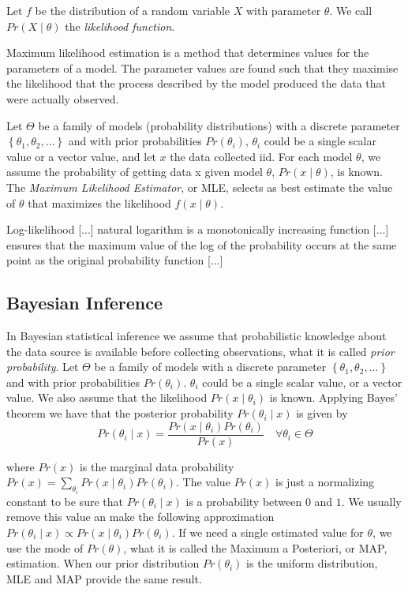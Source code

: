 \begin{definition}
Let $f$ be the distribution of a random variable $X$ with parameter $\theta$. We call $Pr(X \mid \theta)$ the \emph{likelihood function}.
\end{definition}

{\color{red} Maximum likelihood estimation is a method that determines values for the parameters of a model. The parameter values are found such that they maximise the likelihood that the process described by the model produced the data that were actually observed.}

Let $\Theta$ be a family of models (probability distributions) with a discrete parameter $\left\{ \theta_1,\theta_2,\ldots \right\}$ and with prior probabilities $Pr\left(\theta_i \right)$, $\theta_i$ could be a single scalar value or a vector value, and let $x$ the data collected {\color{red} iid}. For each model $\theta$, we assume the probability of getting data x given model $\theta$, $Pr\left(x\mid\theta\right)$, is known. The \emph{Maximum Likelihood Estimator}, or MLE, selects as best estimate the value of $\theta$ that maximizes the likelihood $f\left(x\mid\theta\right)$.

{\color{red} Log-likelihood [...] natural logarithm is a monotonically increasing function [...] ensures that the maximum value of the log of the probability occurs at the same point as the original probability function [...]}


\subsection{Bayesian Inference}

In Bayesian statistical inference we assume that probabilistic knowledge about the data source is available before collecting observations, what it is called \emph{prior probability}. Let $\Theta$ be a family of models with a discrete parameter $\left\{ \theta_1,\theta_2,\ldots \right\}$ and with prior probabilities $Pr\left(\theta_i \right)$. {\color{red} $\theta_i$ could be a single scalar value, or a vector value.} We also assume that the likelihood $Pr\left(x \mid \theta_i \right)$ is known. Applying Bayes' theorem we have that the posterior probability $Pr\left(\theta_i \mid x\right)$ is given by
\[
Pr\left(\theta_i \mid x\right) = \frac{Pr\left(x\mid\theta_i\right) Pr\left(\theta_i \right)}{Pr\left(x\right)} \quad \forall \theta_i \in \Theta
\]

where $Pr\left(x\right)$ is the marginal data probability $Pr\left( x \right) = \sum_{\theta_i} Pr\left( x \mid \theta_i \right) Pr\left( \theta_i \right)$. The value $Pr\left(x\right)$ is just a normalizing constant to be sure that $Pr\left(\theta_i \mid x\right)$ is a probability between $0$ and $1$. We usually remove this value an make the following approximation $Pr\left(\theta_i \mid x\right) \propto Pr\left(x\mid\theta_i\right) Pr\left(\theta_i \right)$. If we need a single estimated value for $\theta$, we use the mode of $Pr(\theta)$, what it is called the Maximum a Posteriori, or MAP, estimation. When our prior distribution $Pr\left(\theta_i \right)$ is the uniform distribution, MLE and MAP provide the same result.

